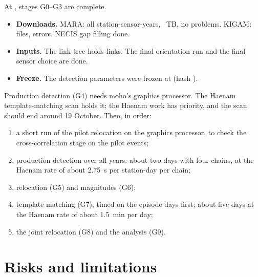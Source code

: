 \documentclass[11pt,a4paper]{article}
\begin{document}
At , stages G0--G3 are complete.
\begin{itemize}
\item \textbf{Downloads.} MARA: all  station-sensor-years, ~TB, no problems. KIGAM:  files,  errors. NECIS gap filling done.
\item \textbf{Inputs.} The link tree holds  links. The final orientation run and the final sensor choice are done.
\item \textbf{Freeze.} The detection parameters were frozen at  (hash ).
\end{itemize}
Production detection (G4) needs moho's graphics processor. The Haenam template-matching scan holds it; the Haenam work has priority, and the scan should end around 19 October. Then, in order:
\begin{enumerate}
\item a short run of the pilot relocation on the graphics processor, to check the cross-correlation stage on the  pilot events;
\item production detection over all years: about two days with four chains, at the Haenam rate of about 2.75~s per station-day per chain;
\item relocation (G5) and magnitudes (G6);
\item template matching (G7), timed on the episode days first; about five days at the Haenam rate of about 1.5~min per day;
\item the joint relocation (G8) and the analysis (G9).
\end{enumerate}

\section{Risks and limitations}
\end{document}
